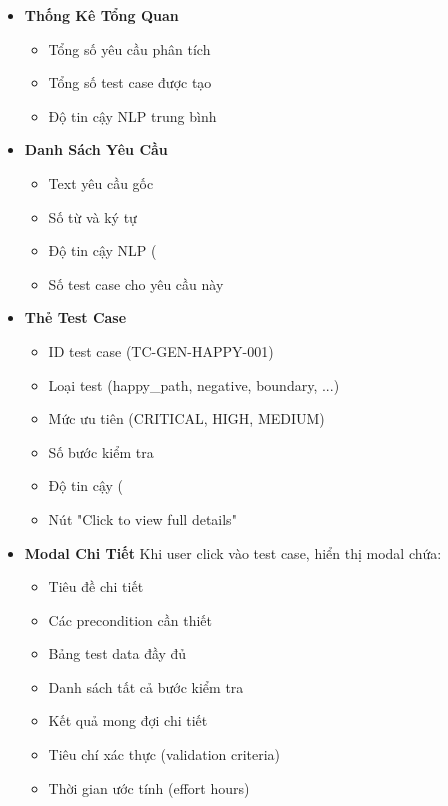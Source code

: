 \documentclass[14pt,a4paper]{article}
\begin{document}
\begin{itemize}
    \item \textbf{Thống Kê Tổng Quan}
        \begin{itemize}
            \item Tổng số yêu cầu phân tích
            \item Tổng số test case được tạo
            \item Độ tin cậy NLP trung bình
        \end{itemize}
    
    \item \textbf{Danh Sách Yêu Cầu}
        \begin{itemize}
            \item Text yêu cầu gốc
            \item Số từ và ký tự
            \item Độ tin cậy NLP (%
            \item Số test case cho yêu cầu này
        \end{itemize}
    
    \item \textbf{Thẻ Test Case}
        \begin{itemize}
            \item ID test case (TC-GEN-HAPPY-001)
            \item Loại test (happy\_path, negative, boundary, ...)
            \item Mức ưu tiên (CRITICAL, HIGH, MEDIUM)
            \item Số bước kiểm tra
            \item Độ tin cậy (%
            \item Nút "Click to view full details"
        \end{itemize}
    
    \item \textbf{Modal Chi Tiết}
        Khi user click vào test case, hiển thị modal chứa:
        \begin{itemize}
            \item Tiêu đề chi tiết
            \item Các precondition cần thiết
            \item Bảng test data đầy đủ
            \item Danh sách tất cả bước kiểm tra
            \item Kết quả mong đợi chi tiết
            \item Tiêu chí xác thực (validation criteria)
            \item Thời gian ước tính (effort hours)
        \end{itemize}
\end{itemize}
\end{document}
